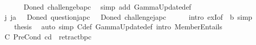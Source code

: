 \begin{isabellebody}
%
\isadelimproof
%
\endisadelimproof
%
\isatagproof
{}\isamarkupfalse%
\ {\isacharminus}{\kern0pt}\isanewline
\ \ \isamarkupfalse%
\ {\isachardoublequoteopen}{\isasymDelta}\ {\isacharparenleft}{\kern0pt}Done\isactrlsup d\ challenge{\isacharbrackleft}{\kern0pt}b{\isacharcomma}{\kern0pt}a{\isacharcomma}{\kern0pt}p\isactrlsup c{\isacharbrackright}{\kern0pt}{\isacharparenright}{\kern0pt}{\isachardoublequoteclose}\ \isamarkupfalse%
\ {\isacharparenleft}{\kern0pt}simp\ add{\isacharcolon}{\kern0pt}\ GammaUpdate{\isacharunderscore}{\kern0pt}def{\isacharparenright}{\kern0pt}\isanewline
\ \ \isamarkupfalse%
\ {\isachardoublequoteopen}{\isasymexists}j{\isachardot}{\kern0pt}\ j{\isasymnoteq}a\ {\isasymand}\ {\isacharparenleft}{\kern0pt}{\isasymDelta}\ {\isacharparenleft}{\kern0pt}Done\isactrlsup d\ question{\isacharbrackleft}{\kern0pt}j{\isacharcomma}{\kern0pt}a{\isacharcomma}{\kern0pt}p\isactrlsup c{\isacharbrackright}{\kern0pt}{\isacharparenright}{\kern0pt}\ {\isasymor}\ {\isasymDelta}\ {\isacharparenleft}{\kern0pt}Done\isactrlsup d\ challenge{\isacharbrackleft}{\kern0pt}j{\isacharcomma}{\kern0pt}a{\isacharcomma}{\kern0pt}p\isactrlsup c{\isacharbrackright}{\kern0pt}{\isacharparenright}{\kern0pt}{\isacharparenright}{\kern0pt}{\isachardoublequoteclose}\isanewline
\ \ \ \ \isamarkupfalse%
\ {\isacharparenleft}{\kern0pt}intro\ exI{\isacharbrackleft}{\kern0pt}of\ {\isacharunderscore}{\kern0pt}\ b{\isacharbrackright}{\kern0pt}{\isacharparenright}{\kern0pt}\ simp\isanewline
\ \ \isamarkupfalse%
\ {\isacharquery}{\kern0pt}thesis\ \isamarkupfalse%
\ {\isacharparenleft}{\kern0pt}auto\ simp{\isacharcolon}{\kern0pt}\ {\isasymGamma}\isactrlsub C{\isacharunderscore}{\kern0pt}def\ GammaUpdate{\isacharunderscore}{\kern0pt}def\ intro{\isacharbang}{\kern0pt}{\isacharcolon}{\kern0pt}\ MemberEntails{\isacharparenright}{\kern0pt}\isanewline
{}\isamarkupfalse%
%
\endisatagproof
{\isafoldproof}%
%
\isadelimproof
\isanewline
%
\endisadelimproof
{}\isamarkupfalse%
\ C{}{\isacharcolon}{\kern0pt}\ {\isachardoublequoteopen}PreCond\ cd\ {\isasymDelta}\ retract{\isacharbrackleft}{\kern0pt}b{\isacharcomma}{\kern0pt}p\isactrlsup c{\isacharcomma}{\kern0pt}{\isasymominus}{\isacharbrackright}{\kern0pt}{\isachardoublequoteclose}\isanewline
%
\isadelimproof
\ \ %
\endisadelimproof
%
\isatagproof

\end{isabellebody}
